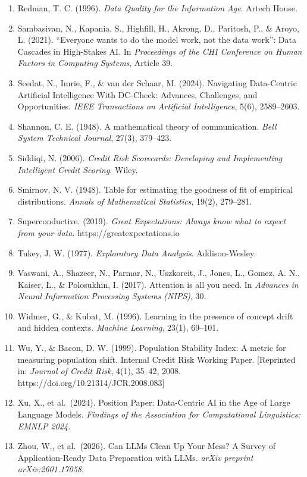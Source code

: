 \documentclass{article}
\begin{document}
\begin{enumerate}
\item
  Redman, T. C. (1996). \emph{Data Quality for the Information Age}.
  Artech House.
\item
  Sambasivan, N., Kapania, S., Highfill, H., Akrong, D., Paritosh, P.,
  \& Aroyo, L. (2021). ``Everyone wants to do the model work, not the
  data work'': Data Cascades in High-Stakes AI. In \emph{Proceedings of
  the CHI Conference on Human Factors in Computing Systems}, Article 39.
\item
  Seedat, N., Imrie, F., \& van der Schaar, M. (2024). Navigating
  Data-Centric Artificial Intelligence With DC-Check: Advances,
  Challenges, and Opportunities. \emph{IEEE Transactions on Artificial
  Intelligence}, 5(6), 2589--2603.
\item
  Shannon, C. E. (1948). A mathematical theory of communication.
  \emph{Bell System Technical Journal}, 27(3), 379--423.
\item
  Siddiqi, N. (2006). \emph{Credit Risk Scorecards: Developing and
  Implementing Intelligent Credit Scoring}. Wiley.
\item
  Smirnov, N. V. (1948). Table for estimating the goodness of fit of
  empirical distributions. \emph{Annals of Mathematical Statistics},
  19(2), 279--281.
\item
  Superconductive. (2019). \emph{Great Expectations: Always know what to
  expect from your data}. https://greatexpectations.io
\item
  Tukey, J. W. (1977). \emph{Exploratory Data Analysis}. Addison-Wesley.
\item
  Vaswani, A., Shazeer, N., Parmar, N., Uszkoreit, J., Jones, L., Gomez,
  A. N., Kaiser, Ł., \& Polosukhin, I. (2017). Attention is all you
  need. In \emph{Advances in Neural Information Processing Systems
  (NIPS)}, 30.
\item
  Widmer, G., \& Kubat, M. (1996). Learning in the presence of concept
  drift and hidden contexts. \emph{Machine Learning}, 23(1), 69--101.
\item
  Wu, Y., \& Bacon, D. W. (1999). Population Stability Index: A metric
  for measuring population shift. Internal Credit Risk Working Paper.
  {[}Reprinted in: \emph{Journal of Credit Risk}, 4(1), 35--42, 2008.
  https://doi.org/10.21314/JCR.2008.083{]}
\item
  Xu, X., et al.~(2024). Position Paper: Data-Centric AI in the Age of
  Large Language Models. \emph{Findings of the Association for
  Computational Linguistics: EMNLP 2024}.
\item
  Zhou, W., et al.~(2026). Can LLMs Clean Up Your Mess? A Survey of
  Application-Ready Data Preparation with LLMs. \emph{arXiv preprint
  arXiv:2601.17058}.
\end{enumerate}
\end{document}
